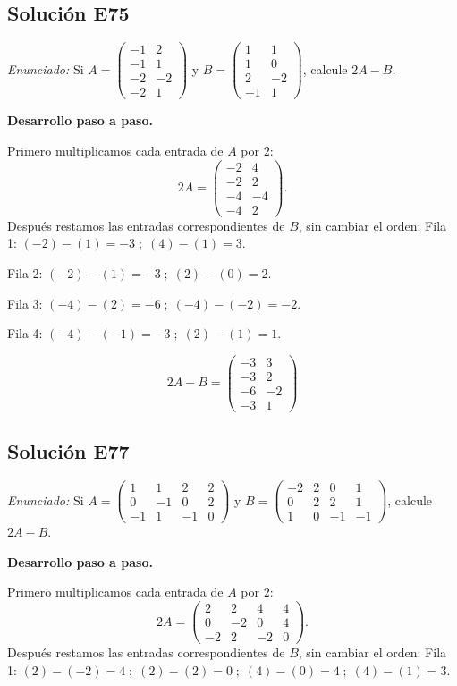 \documentclass[12pt]{article}
\theoremstyle{remark}
\newcommand{\solucion}[2]{\Needspace{11\baselineskip}\subsection*{Solución E#1}\noindent\textit{Enunciado:} #2\par\medskip\noindent\textbf{Desarrollo paso a paso.}\par\medskip}
\begin{document}
\medskip

\solucion{75}{Si $A=\begin{pmatrix}-1&2\\-1&1\\-2&-2\\-2&1\end{pmatrix}$ y $B=\begin{pmatrix}1&1\\1&0\\2&-2\\-1&1\end{pmatrix}$, calcule $2A-B$.}
Primero multiplicamos cada entrada de $A$ por $2$:
\[
2A=\begin{pmatrix}-2&4\\-2&2\\-4&-4\\-4&2\end{pmatrix}.
\]
Después restamos las entradas correspondientes de $B$, sin cambiar el orden:
Fila 1: $(-2)-(1)=-3\; ;\; (4)-(1)=3$.

Fila 2: $(-2)-(1)=-3\; ;\; (2)-(0)=2$.

Fila 3: $(-4)-(2)=-6\; ;\; (-4)-(-2)=-2$.

Fila 4: $(-4)-(-1)=-3\; ;\; (2)-(1)=1$.

\[
\boxed{2A-B=\begin{pmatrix}-3&3\\-3&2\\-6&-2\\-3&1\end{pmatrix}}
\]

\medskip

\solucion{77}{Si $A=\begin{pmatrix}1&1&2&2\\0&-1&0&2\\-1&1&-1&0\end{pmatrix}$ y $B=\begin{pmatrix}-2&2&0&1\\0&2&2&1\\1&0&-1&-1\end{pmatrix}$, calcule $2A-B$.}
Primero multiplicamos cada entrada de $A$ por $2$:
\[
2A=\begin{pmatrix}2&2&4&4\\0&-2&0&4\\-2&2&-2&0\end{pmatrix}.
\]
Después restamos las entradas correspondientes de $B$, sin cambiar el orden:
Fila 1: $(2)-(-2)=4\; ;\; (2)-(2)=0\; ;\; (4)-(0)=4\; ;\; (4)-(1)=3$.
\end{document}
